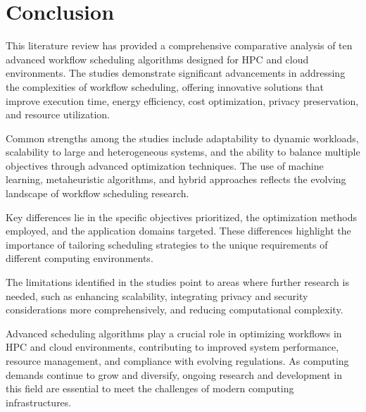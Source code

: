 \documentclass[a4paper, final]{article}
\begin{document}
\cleardoublepage
{}
\newpage
{}
\section*{Conclusion}
This literature review has provided a comprehensive comparative analysis of ten advanced workflow scheduling algorithms 
designed for HPC and cloud environments. The studies demonstrate significant advancements in addressing the complexities 
of workflow scheduling, offering innovative solutions that improve execution time, energy efficiency, cost optimization, 
privacy preservation, and resource utilization.

Common strengths among the studies include adaptability to dynamic workloads, scalability to large and heterogeneous systems, 
and the ability to balance multiple objectives through advanced optimization techniques. The use of machine learning, 
metaheuristic algorithms, and hybrid approaches reflects the evolving landscape of workflow scheduling research.

Key differences lie in the specific objectives prioritized, the optimization methods employed, and the application domains 
targeted. These differences highlight the importance of tailoring scheduling strategies to the unique requirements of different 
computing environments.

The limitations identified in the studies point to areas where further research is needed, such as enhancing scalability, 
integrating privacy and security considerations more comprehensively, and reducing computational complexity.

Advanced scheduling algorithms play a crucial role in optimizing workflows in HPC and cloud environments, contributing to 
improved system performance, resource management, and compliance with evolving regulations. As computing demands continue to 
grow and diversify, ongoing research and development in this field are essential to meet the challenges of modern computing 
infrastructures.
\end{document}
